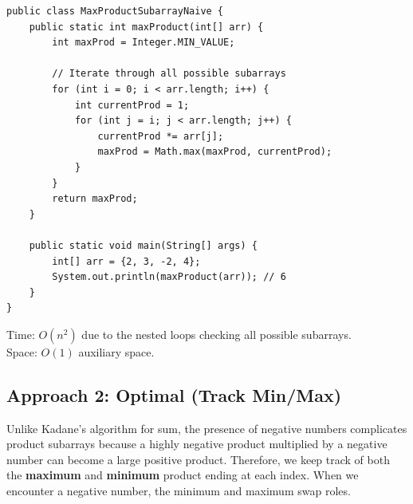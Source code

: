 \documentclass[12pt,a4paper,oneside]{book}
\begin{document}
\begin{lstlisting}[caption={Maximum Product Subarray --- Naive Brute Force, O(n$^2$) time O(1) space}]
public class MaxProductSubarrayNaive {
    public static int maxProduct(int[] arr) {
        int maxProd = Integer.MIN_VALUE;

        // Iterate through all possible subarrays
        for (int i = 0; i < arr.length; i++) {
            int currentProd = 1;
            for (int j = i; j < arr.length; j++) {
                currentProd *= arr[j];
                maxProd = Math.max(maxProd, currentProd);
            }
        }
        return maxProd;
    }

    public static void main(String[] args) {
        int[] arr = {2, 3, -2, 4};
        System.out.println(maxProduct(arr)); // 6
    }
}
\end{lstlisting}

\begin{complexity}
Time: $O(n^2)$ due to the nested loops checking all possible subarrays.\\
Space: $O(1)$ auxiliary space.
\end{complexity}

\subsection{Approach 2: Optimal (Track Min/Max)}
Unlike Kadane's algorithm for sum, the presence of negative numbers complicates product subarrays because a highly negative product multiplied by a negative number can become a large positive product. Therefore, we keep track of both the \textbf{maximum} and \textbf{minimum} product ending at each index. When we encounter a negative number, the minimum and maximum swap roles.
\end{document}
